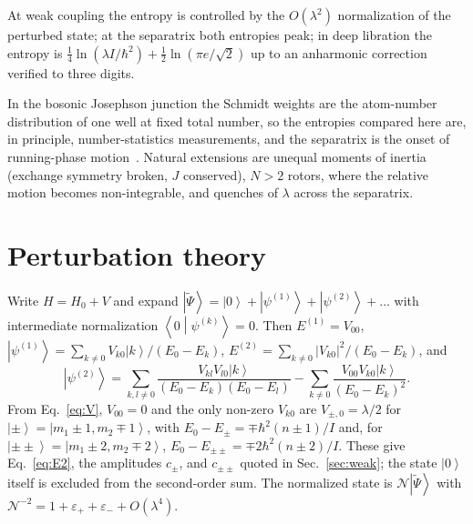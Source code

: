 \documentclass[pra,twocolumn,superscriptaddress,longbibliography,floatfix]{revtex4-2}
\newcommand{\ket}[1]{\left|#1\right\rangle}
\newcommand{\braket}[2]{\left\langle#1\middle|#2\right\rangle}
\newcommand{\epsp}{\varepsilon_{+}}
\newcommand{\epsm}{\varepsilon_{-}}
\begin{document}
At weak coupling the entropy is controlled by the $O(\lambda^{2})$ normalization
of the perturbed state; at the separatrix both entropies peak; in deep libration
the entropy is $\tfrac14\ln(\lambda I/\hbar^{2})+\tfrac12\ln(\pi e/\sqrt2)$ up to
an anharmonic correction verified to three digits.

In the bosonic Josephson junction the Schmidt weights are the atom-number
distribution of one well at fixed total number, so the entropies compared here
are, in principle, number-statistics measurements, and the separatrix is the
onset of running-phase motion~\cite{Albiez05,GatiOberthaler}. Natural extensions are unequal moments of
inertia (exchange symmetry broken, $J$ conserved), $N>2$ rotors, where the
relative motion becomes non-integrable, and quenches of $\lambda$ across the
separatrix.

\begin{acknowledgments}
[To be completed.]
\end{acknowledgments}

\appendix

\section{Perturbation theory}
\label{app:pt}

Write $H=H_{0}+V$ and expand
$\ket{\widetilde\Psi}=\ket0+\ket{\psi^{(1)}}+\ket{\psi^{(2)}}+\dots$ with
intermediate normalization $\braket0{\psi^{(k)}}=0$. Then $E^{(1)}=V_{00}$,
$\ket{\psi^{(1)}}=\sum_{k\ne0}V_{k0}\ket k/(E_{0}-E_{k})$,
$E^{(2)}=\sum_{k\ne0}|V_{k0}|^{2}/(E_{0}-E_{k})$, and
\begin{equation}
\ket{\psi^{(2)}}=\sum_{k,l\ne0}\frac{V_{kl}V_{l0}\ket k}{(E_{0}-E_{k})(E_{0}-E_{l})}
-\sum_{k\ne0}\frac{V_{00}V_{k0}\ket k}{(E_{0}-E_{k})^{2}}.
\end{equation}
From Eq.~\eqref{eq:V}, $V_{00}=0$ and the only non-zero $V_{k0}$ are
$V_{\pm,0}=\lambda/2$ for $\ket\pm=\ket{m_{1}\pm1,m_{2}\mp1}$, with
$E_{0}-E_{\pm}=\mp\hbar^{2}(n\pm1)/I$ and, for $\ket{\pm\pm}=\ket{m_{1}\pm2,m_{2}\mp2}$,
$E_{0}-E_{\pm\pm}=\mp2\hbar^{2}(n\pm2)/I$. These give Eq.~\eqref{eq:E2}, the
amplitudes $c_{\pm}$, and $c_{\pm\pm}$ quoted in Sec.~\ref{sec:weak}; the state
$\ket0$ itself is excluded from the second-order sum. The normalized state is
$\mathcal{N}\ket{\widetilde\Psi}$ with $\mathcal{N}^{-2}=1+\epsp+\epsm+O(\lambda^{4})$.
\end{document}
